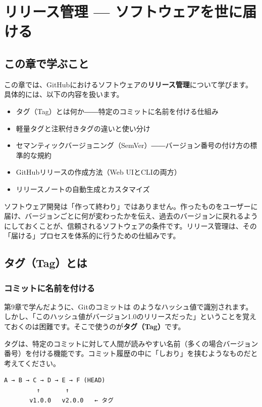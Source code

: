 \chapter{リリース管理 --- ソフトウェアを世に届ける}

\section{この章で学ぶこと}

この章では、GitHubにおけるソフトウェアの\textbf{リリース管理}について学びます。具体的には、以下の内容を扱います。

\begin{itemize}
  \item タグ（Tag）とは何か――特定のコミットに名前を付ける仕組み
  \item 軽量タグと注釈付きタグの違いと使い分け
  \item セマンティックバージョニング（SemVer）――バージョン番号の付け方の標準的な規約
  \item GitHubリリースの作成方法（Web UIとCLIの両方）
  \item リリースノートの自動生成とカスタマイズ
\end{itemize}

ソフトウェア開発は「作って終わり」ではありません。作ったものをユーザーに届け、バージョンごとに何が変わったかを伝え、過去のバージョンに戻れるようにしておくことが、信頼されるソフトウェアの条件です。リリース管理は、その「届ける」プロセスを体系的に行うための仕組みです。

\section{タグ（Tag）とは}

\subsection{コミットに名前を付ける}

第9章で学んだように、Gitのコミットは  のようなハッシュ値で識別されます。しかし、「このハッシュ値がバージョン1.0のリリースだった」ということを覚えておくのは困難です。そこで使うのが\textbf{タグ（Tag）}です。

タグは、特定のコミットに対して人間が読みやすい名前（多くの場合バージョン番号）を付ける機能です。コミット履歴の中に「しおり」を挟むようなものだと考えてください。

\begin{lstlisting}[language={}]
A → B → C → D → E → F (HEAD)
         ↑       ↑
       v1.0.0   v2.0.0   ← タグ
\end{lstlisting}

